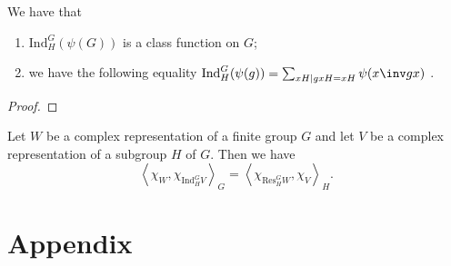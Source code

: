 \documentclass[12pt, a4paper]{article}
\begin{document}
\begin{lemma}
    We have that 
    \begin{enumerate}
        \item \(\text{Ind}_H^G (\psi(G))\) is a class function on \(G\);
        \item we have the following equality \(\text{Ind}_H^G(\psi(g))= \sum_{xH \mid gxH=xH} \psi(x\inv gx)\) .
    \end{enumerate}
\end{lemma}

\begin{proof}
    
\end{proof}

\begin{mdthm}
    Let \(W\) be a complex representation of a finite group \(G\) and let \(V\) be a complex representation of a subgroup \(H\) of \(G\). Then we have 
    \[\left\langle \chi_W,\chi_{\text{Ind}_H^G V} \right\rangle_G=\left\langle \chi_{\text{Res}_H^G W},\chi_{V} \right\rangle_H.\]
\end{mdthm}

\pagebreak

\appendix

\section*{Appendix}
\end{document}
